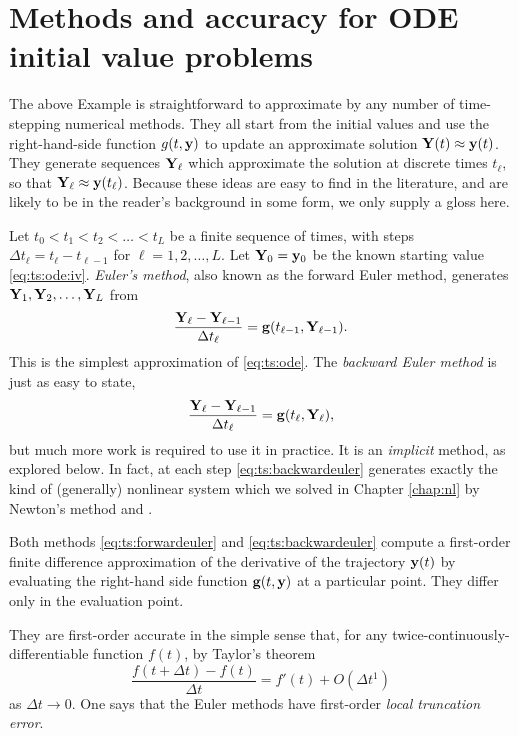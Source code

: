 \section{Methods and accuracy for ODE initial value problems}  The above Example is straightforward to approximate by any number of time-stepping numerical methods.  They all start from the initial values and use the right-hand-side function $g(t,\mathbf{y})$ to update an approximate solution $\mathbf{Y}(t) \approx \mathbf{y}(t)$.  They generate sequences $\mathbf{Y}_\ell$ which approximate the solution at discrete times $t_\ell$, so that $\mathbf{Y}_\ell \approx \mathbf{y}(t_\ell)$.  Because these ideas are easy to find in the literature, and are likely to be in the reader's background in some form, we only supply a gloss here.

Let $t_0<t_1<t_2<\dots<t_L$ be a finite sequence of times, with steps $\Delta t_\ell = t_\ell - t_{\ell-1}$ for $\ell=1,2,\dots,L$.  Let $\mathbf{Y}_0 = \mathbf{y}_0$ be the known starting value  \eqref{eq:ts:ode:iv}.  \emph{Euler's method}, also known as the forward Euler method, generates $\mathbf{Y}_1,\mathbf{Y}_2,\dots,\mathbf{Y}_L$ from
\begin{equation}
\frac{\mathbf{Y}_\ell - \mathbf{Y}_{\ell-1}}{\Delta t_\ell} = \mathbf{g}(t_{\ell-1},\mathbf{Y}_{\ell-1}). \label{eq:ts:forwardeuler}
\end{equation}
This is the simplest approximation of \eqref{eq:ts:ode}.  The \emph{backward Euler method} is just as easy to state,
\begin{equation}
\frac{\mathbf{Y}_\ell - \mathbf{Y}_{\ell-1}}{\Delta t_\ell} = \mathbf{g}(t_{\ell},\mathbf{Y}_{\ell}),  \label{eq:ts:backwardeuler}
\end{equation}
but much more work is required to use it in practice.  It is an \emph{implicit} method, as explored below.  In fact, at each step \eqref{eq:ts:backwardeuler} generates exactly the kind of (generally) nonlinear system which we solved in Chapter \ref{chap:nl} by Newton's method and \pSNES.

Both methods \eqref{eq:ts:forwardeuler} and \eqref{eq:ts:backwardeuler} compute a first-order finite difference approximation of the derivative of the trajectory $\mathbf{y}(t)$ by evaluating the right-hand side function $\mathbf{g}(t,\mathbf{y})$ at a particular point.  They differ only in the evaluation point.

They are first-order accurate in the simple sense that, for any twice-continuously-differentiable function $f(t)$, by Taylor's theorem
    $$\frac{f(t+\Delta t) - f(t)}{\Delta t} = f'(t) + O(\Delta t^1)$$
as $\Delta t \to 0$.  One says that the Euler methods have first-order \emph{local truncation error}.

